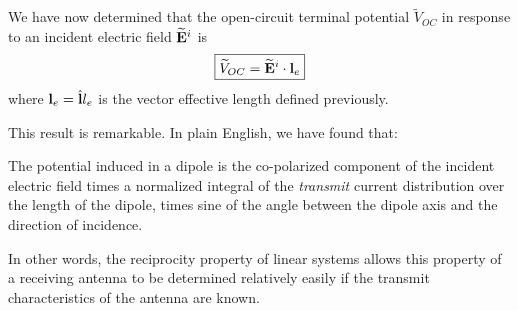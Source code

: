 We have now determined that the open-circuit terminal potential $\widetilde{V}_{OC}$ in response to an incident electric field $\widetilde{\bf E}^i$ is
%
\begin{equation}
\boxed{
\widetilde{V}_{OC} = \widetilde{\bf E}^i \cdot {\bf l}_e
}
\label{m0215_eVOCEL}
\end{equation}
%
where ${\bf l}_e = \hat{\bf l} l_e$ is the vector effective length defined previously.

This result is remarkable. In plain English, we have found that: 
%
\begin{mdframed}[backgroundcolor=yellow!20,nobreak=true] 
The potential induced in a dipole is the co-polarized component of the incident electric field times a normalized integral of the \emph{transmit} current distribution over the length of the dipole, times sine of the angle between the dipole axis and the direction of incidence. 
\end{mdframed}
%
In other words, the reciprocity property of linear systems allows this property of a receiving antenna to be determined relatively easily if the transmit characteristics of the antenna are known. 

